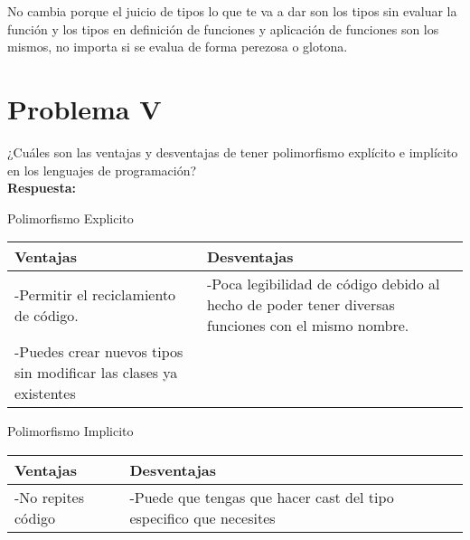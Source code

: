 \documentclass{article}
\begin{document}
No cambia porque el juicio de tipos lo que te va a dar son los tipos sin evaluar la función y los tipos en definición de funciones y aplicación de funciones
son los mismos, no importa si se evalua de forma perezosa o glotona.

\section*{Problema V}
¿Cuáles son las ventajas y desventajas de tener polimorfismo explícito e implícito
en los lenguajes de programación?
\\
\textbf{Respuesta: }
\\


\begin{center}
Polimorfismo Explicito
\end{center}
\begin{tabularx}{\textwidth}{X|X}
	  \textbf{Ventajas} & \textbf{Desventajas} \\
	\hline
	-Permitir el reciclamiento de código. & -Poca legibilidad de código debido al hecho de poder tener diversas funciones con el mismo nombre. \\
	-Puedes crear nuevos tipos sin modificar las clases ya existentes & \\
\end{tabularx}

\begin{center}
Polimorfismo Implicito
\end{center}
\begin{tabularx}{\textwidth}{X|X}
	  \textbf{Ventajas} & \textbf{Desventajas} \\
	\hline
	-No repites código & -Puede que tengas que hacer cast del tipo especifico que necesites \\
\end{tabularx}
\end{document}
